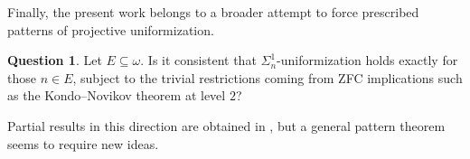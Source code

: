 \documentclass[11pt]{article}
\theoremstyle{plain}
\theoremstyle{definition}
\newtheorem{question}[theorem]{Question}
\theoremstyle{remark}
\begin{document}
Finally, the present work belongs to a broader attempt to force prescribed
patterns of projective uniformization.

\begin{question}
Let \(E\subseteq\omega\).  Is it consistent that
\(\Sigma^1_n\)-uniformization holds exactly for those \(n\in E\), subject to the
trivial restrictions coming from ZFC implications such as the Kondo--Novikov
theorem at level \(2\)?
\end{question}

Partial results in this direction are obtained in
\cite{HoffelnerUpperSigma,HoffelnerSigma34}, but a general pattern theorem seems
to require new ideas.



\end{document}
